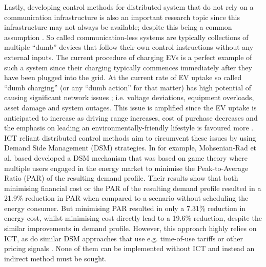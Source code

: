 Lastly, developing control methods for distributed system that do not rely on a communication infrastructure is also an important research topic since this infrastructure may not always be available; despite this being a common assumption \cite{Hatziargyriou2015}.
So called communication-less systems are typically collections of multiple ``dumb'' devices that follow their own control instructions without any external inputs.
The current procedure of charging EVs is a perfect example of such a system since their charging typically commences immediately after they have been plugged into the grid.
At the current rate of EV uptake so called ``dumb charging'' (or any ``dumb action'' for that matter) has high potential of causing significant network issues \cite{Hota2014, Liu2015a}; i.e. voltage deviations, equipment overloads, asset damage and system outages.
This issue is amplified since the EV uptake is anticipated to increase as driving range increases, cost of purchase decreases and the emphasis on leading an environmentally-friendly lifestyle is favoured more \cite{Shah2015}.
ICT reliant distributed control methods aim to circumvent these issues by using Demand Side Management (DSM) strategies.
In \cite{Mohsenian-Rad2010} for example, Mohsenian-Rad et al. based developed a DSM mechanism that was based on game theory where multiple users engaged in the energy market to minimise the Peak-to-Average Ratio (PAR) of the resulting demand profile.
Their results show that both minimising financial cost or the PAR of the resulting demand profile resulted in a 21.9\% reduction in PAR when compared to a scenario without scheduling the energy consumer.
But minimising PAR resulted in only a 7.31\% reduction in energy cost, whilst minimising cost directly lead to a 19.6\% reduction, despite the similar improvements in demand profile.
However, this approach highly relies on ICT, as do similar DSM approaches that use e.g. time-of-use tariffs \cite{Deilami2011, Surles2012} or other pricing signals \cite{Masoum2015}.
None of them can be implemented without ICT and instead an indirect method must be sought.



